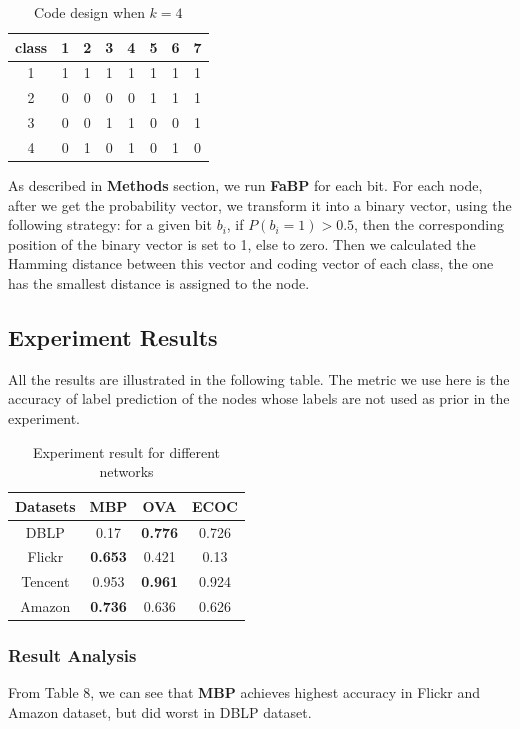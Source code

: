 \begin{table}[!ht]
\centering
\begin{tabular}{c|ccccccc}
\toprule
\textbf{class} & 1 & 2 & 3 & 4 & 5 & 6 & 7\\
\midrule
1 & 1 & 1 & 1 & 1 & 1 & 1 & 1\\
2 & 0 & 0 & 0 & 0 & 1 & 1 & 1\\
3 & 0 & 0 & 1 & 1 & 0 & 0 & 1\\
4 & 0 & 1 & 0 & 1 & 0 & 1 & 0\\
\bottomrule
\end{tabular}
\caption{Code design when $k=4$}
\end{table}

As described in \textbf{Methods} section, we run \textbf{FaBP} for each bit. For each node, after we get the probability vector, we transform it into a binary vector, using the following strategy: for a given bit $b_i$, if $P(b_i=1) > 0.5$, then the corresponding position of the binary vector is set to 1, else to zero. Then we calculated the Hamming distance between this vector and coding vector of each class, the one has the smallest distance is assigned to the node. 

\subsection{Experiment Results}
All the results are illustrated in the following table. The metric we use here is the accuracy of label prediction of the nodes whose labels are not used as prior in the experiment.
\begin{table}[!ht]
\centering
\begin{tabular}{c|ccc}
\toprule
\textbf{Datasets} & \textbf{MBP} & \textbf{OVA} & \textbf{ECOC}\\
\midrule
DBLP &0.17 &\textbf{0.776} &0.726\\
Flickr & \textbf{0.653} & 0.421 & 0.13\\
Tencent & 0.953 & \textbf{0.961} & 0.924\\
Amazon & \textbf{0.736} & 0.636 & 0.626\\
\bottomrule
\end{tabular}
\caption{Experiment result for different networks}
\end{table}

\subsubsection*{Result Analysis}
From Table 8, we can see that \textbf{MBP} achieves highest accuracy in Flickr and Amazon dataset, but did worst in DBLP dataset. 

